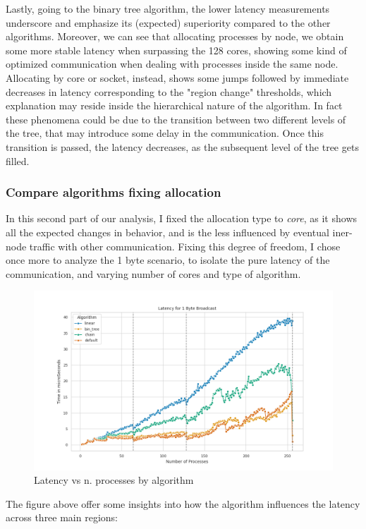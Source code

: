 \documentclass{article}
\begin{document}
	Lastly, going to the binary tree algorithm, the lower latency measurements underscore and emphasize its (expected) superiority compared to the other algorithms. Moreover, we can see that allocating processes by node, we obtain some more stable latency when surpassing the 128 cores, showing some kind of optimized communication when dealing with processes inside the same node.
	Allocating by core or socket, instead, shows some jumps followed by immediate decreases in latency corresponding to the "region change" thresholds, which explanation may reside inside the hierarchical nature of the algorithm. In fact these phenomena could be due to the transition between two different levels of the tree, that may introduce some delay in the communication. Once this transition is passed, the latency decreases, as the subsequent level of the tree gets filled.
	
	\subsubsection{Compare algorithms fixing allocation}
	
	In this second part of our analysis, I fixed the allocation type to \textit{core}, as it shows all the expected changes in behavior, and is the less influenced by eventual iner-node traffic with other communication. Fixing this degree of freedom, I chose once more to analyze the 1 byte scenario, to isolate the pure latency of the communication, and varying number of cores and type of algorithm.
	
	\begin{figure}[h]
		\centering
		\includegraphics[width=0.7\linewidth]{../exercise1/plots/bcast_all_1byte}
		\caption{Latency vs n. processes by algorithm}
		\label{fig:bcastall1byte}
	\end{figure}
	
	
	The figure above offer some insights into how the algorithm influences the latency across three main regions:
	
\end{document}
